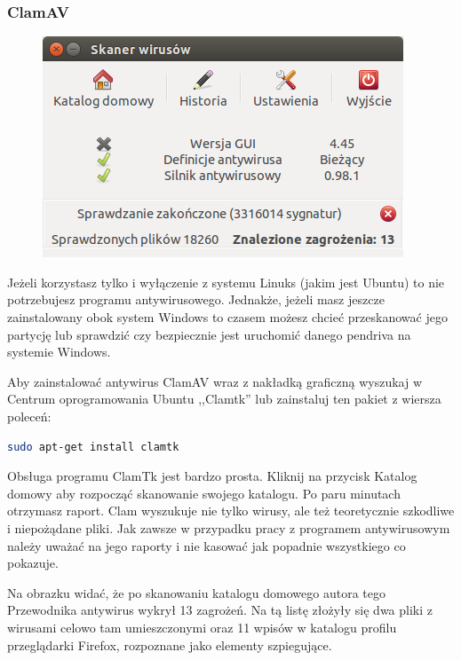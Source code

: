 \subsubsection{ClamAV}
\begin{figure}
	\vspace{-10pt}
	\includegraphics[width=\linewidth]{images/programy_clam.png}
\end{figure}

Jeżeli korzystasz tylko i wyłączenie z systemu Linuks (jakim jest Ubuntu) to nie potrzebujesz programu antywirusowego. Jednakże, jeżeli masz jeszcze zainstalowany obok system Windows to czasem możesz chcieć przeskanować jego partycję lub sprawdzić czy bezpiecznie jest uruchomić danego pendriva na systemie Windows.

Aby zainstalować antywirus \textcolor{ubuntu_orange}{ClamAV} wraz z nakładką graficzną wyszukaj w Centrum oprogramowania Ubuntu ,,Clamtk'' lub zainstaluj ten pakiet z wiersza poleceń:
\begin{lstlisting}[language=bash]
sudo apt-get install clamtk
\end{lstlisting}

Obsługa programu ClamTk jest bardzo prosta. Kliknij na przycisk \textcolor{ubuntu_orange}{Katalog domowy} aby rozpocząć skanowanie swojego katalogu. Po paru minutach otrzymasz raport. Clam wyszukuje nie tylko wirusy, ale też teoretycznie szkodliwe i niepożądane pliki. Jak zawsze w przypadku pracy z programem antywirusowym należy uważać na jego raporty i nie kasować jak popadnie wszystkiego co pokazuje.

Na obrazku widać, że po skanowaniu katalogu domowego autora tego Przewodnika antywirus wykrył 13 zagrożeń. Na tą listę złożyły się dwa pliki z wirusami celowo tam umieszczonymi oraz 11 wpisów w katalogu profilu przeglądarki Firefox, rozpoznane jako elementy szpiegujące.

